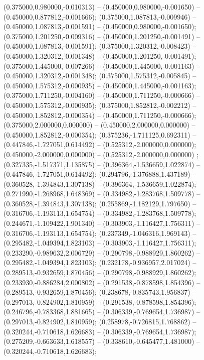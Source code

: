  (0.375000,0.980000,-0.010313) -- (0.450000,0.980000,-0.001650) -- (0.450000,0.877812,-0.001666);
 (0.375000,1.087813,-0.009946) -- (0.450000,1.087813,-0.001591) -- (0.450000,0.980000,-0.001650);
 (0.375000,1.201250,-0.009316) -- (0.450000,1.201250,-0.001491) -- (0.450000,1.087813,-0.001591);
 (0.375000,1.320312,-0.008423) -- (0.450000,1.320312,-0.001348) -- (0.450000,1.201250,-0.001491);
 (0.375000,1.445000,-0.007266) -- (0.450000,1.445000,-0.001163) -- (0.450000,1.320312,-0.001348);
 (0.375000,1.575312,-0.005845) -- (0.450000,1.575312,-0.000935) -- (0.450000,1.445000,-0.001163);
 (0.375000,1.711250,-0.004160) -- (0.450000,1.711250,-0.000666) -- (0.450000,1.575312,-0.000935);
 (0.375000,1.852812,-0.002212) -- (0.450000,1.852812,-0.000354) -- (0.450000,1.711250,-0.000666);
 (0.375000,2.000000,0.000000) -- (0.450000,2.000000,0.000000) -- (0.450000,1.852812,-0.000354);
 (0.375236,-1.711125,0.692311) -- (0.447846,-1.727051,0.614492) -- (0.525312,-2.000000,0.000000);
 (0.450000,-2.000000,0.000000) -- (0.525312,-2.000000,0.000000) ;
 (0.327335,-1.517371,1.135875) -- (0.396364,-1.536659,1.022874) -- (0.447846,-1.727051,0.614492);
 (0.294796,-1.376888,1.437189) -- (0.360528,-1.394843,1.307138) -- (0.396364,-1.536659,1.022874);
 (0.271990,-1.268968,1.648369) -- (0.334982,-1.283768,1.509778) -- (0.360528,-1.394843,1.307138);
 (0.255869,-1.182129,1.797650) -- (0.316706,-1.193113,1.654754) -- (0.334982,-1.283768,1.509778);
 (0.244671,-1.109422,1.901340) -- (0.303903,-1.116427,1.756311) -- (0.316706,-1.193113,1.654754);
 (0.237349,-1.046316,1.969143) -- (0.295482,-1.049394,1.823103) -- (0.303903,-1.116427,1.756311);
 (0.233290,-0.989632,2.006729) -- (0.290798,-0.988929,1.860262) -- (0.295482,-1.049394,1.823103);
 (0.232178,-0.936957,2.017024) -- (0.289513,-0.932659,1.870456) -- (0.290798,-0.988929,1.860262);
 (0.233930,-0.886284,2.000802) -- (0.291538,-0.878598,1.854396) -- (0.289513,-0.932659,1.870456);
 (0.238678,-0.835743,1.956837) -- (0.297013,-0.824902,1.810959) -- (0.291538,-0.878598,1.854396);
 (0.246796,-0.783368,1.881665) -- (0.306339,-0.769654,1.736987) -- (0.297013,-0.824902,1.810959);
 (0.258978,-0.726815,1.768862) -- (0.320244,-0.710618,1.626683) -- (0.306339,-0.769654,1.736987);
 (0.275209,-0.663633,1.618557) -- (0.338610,-0.645477,1.481000) -- (0.320244,-0.710618,1.626683);
